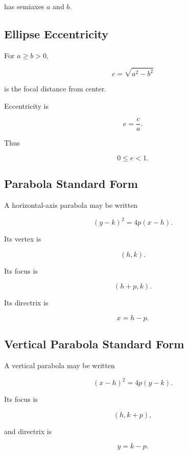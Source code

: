 has semiaxes \(a\) and \(b\).

\subsection{Ellipse Eccentricity}
\label{subsec:ellipse-eccentricity-reference}

For \(a\geq b>0\),

\[
\boxed{
c
=
\sqrt{a^2-b^2}
}
\]

is the focal distance from center.

Eccentricity is

\[
\boxed{
e
=
\frac{c}{a}.
}
\]

Thus

\[
\boxed{
0\leq e<1.
}
\]

\subsection{Parabola Standard Form}
\label{subsec:parabola-standard-reference}

A horizontal-axis parabola may be written

\[
\boxed{
(y-k)^2
=
4p(x-h).
}
\]

Its vertex is

\[
\boxed{
(h,k).
}
\]

Its focus is

\[
\boxed{
(h+p,k).
}
\]

Its directrix is

\[
\boxed{
x=h-p.
}
\]

\subsection{Vertical Parabola Standard Form}
\label{subsec:vertical-parabola-standard}

A vertical parabola may be written

\[
\boxed{
(x-h)^2
=
4p(y-k).
}
\]

Its focus is

\[
\boxed{
(h,k+p),
}
\]

and directrix is

\[
\boxed{
y=k-p.
}
\]

